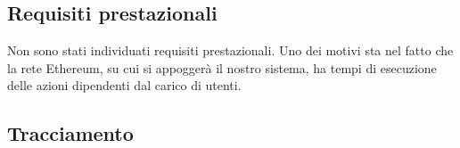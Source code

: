 \subsection{Requisiti prestazionali}
Non sono stati individuati requisiti prestazionali. Uno dei motivi sta nel fatto che la rete Ethereum, su cui si appoggerà il nostro sistema, ha tempi di esecuzione delle azioni dipendenti dal carico di utenti.
%		
%		

\subsection{Tracciamento}
